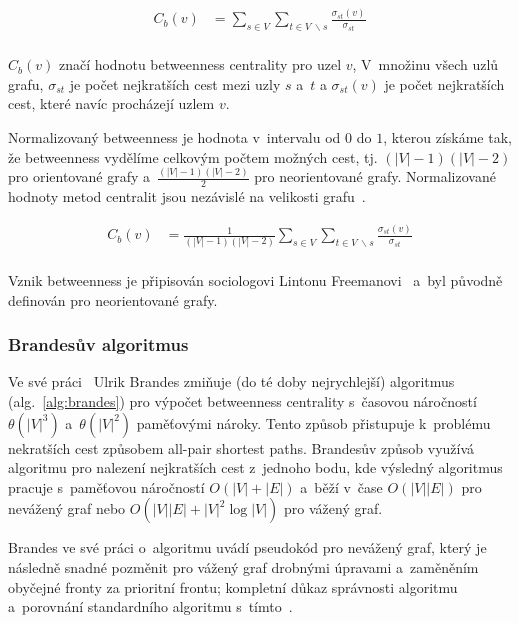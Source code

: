 \documentclass{bakalarka}
\begin{document}
\begin{align*}
C_b(v) &= \displaystyle\sum\limits_{s \in V} \displaystyle\sum\limits_{t \in V~\backslash s} \frac{\sigma_{st}(v)}{\sigma_{st}} \\
\end{align*}

$C_b(v)$ značí hodnotu betweenness centrality pro uzel $v$, V~množinu všech
uzlů grafu, $\sigma_{st}$ je počet nejkratších cest mezi uzly $s$ a~$t$ a
$\sigma_{st}(v)$ je počet nejkratších cest, které navíc procházejí uzlem $v$.

Normalizovaný betweenness je hodnota v~intervalu od $0$ do $1$, kterou získáme
tak, že betweenness vydělíme celkovým počtem možných cest, tj. $(|V| - 1)(|V| -
2)$ pro orientované grafy a~$\frac{(|V| - 1)(|V| - 2)}{2}$ pro neorientované
grafy. Normalizované hodnoty metod centralit jsou nezávislé na velikosti
grafu~\citep{whiteborgatti1994}.

\begin{align*}
C_b(v) &= \frac{1}{(|V| - 1)(|V| - 2)} \displaystyle\sum\limits_{s \in V} \displaystyle\sum\limits_{t \in V~\backslash s} \frac{\sigma_{st}(v)}{\sigma_{st}} \\
\end{align*}

Vznik betweenness je připisován sociologovi Lintonu
Freemanovi~\citep{freeman1977} a~byl původně definován pro neorientované grafy.

\subsubsection{Brandesův algoritmus}
Ve své práci~\citep{brandes2001} Ulrik Brandes zmiňuje (do té doby
nejrychlejší) algoritmus (alg.~\ref{alg:brandes}) pro výpočet betweenness
centrality s~časovou náročností $\theta(|V|^3)$ a~$\theta(|V|^2)$ paměťovými
nároky. Tento způsob přistupuje k~problému nekratších cest způsobem all-pair
shortest paths.  Brandesův způsob využívá algoritmu pro nalezení nejkratších
cest z~jednoho bodu, kde výsledný algoritmus pracuje s~paměťovou náročností
$O(|V| + |E|)$ a~běží v~čase $O(|V||E|)$ pro nevážený graf nebo $O(|V||E| +
|V|^2 \log|V|)$ pro vážený graf. 


Brandes ve své práci o~algoritmu uvádí pseudokód pro nevážený graf, který je
následně snadné pozměnit pro vážený graf drobnými úpravami a~zaměněním obyčejné
fronty za prioritní frontu; kompletní důkaz správnosti algoritmu a~porovnání
standardního algoritmu s~tímto~\citep{brandes2001}.
\end{document}
